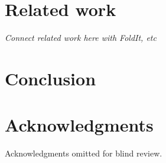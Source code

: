 \documentclass{sigchi}
\begin{document}

\section{Related work}

\emph{Connect related work here with FoldIt, etc}

\section{Conclusion}

\section{Acknowledgments}
Acknowledgments omitted for blind review.

\balance






\end{document}
